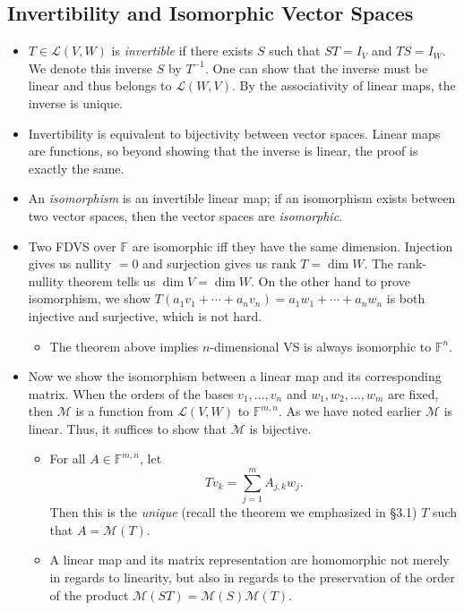 \documentclass{article}
\newcommand{\F}{\mathbb{F}}
\renewcommand{\d}{\dim}
\newcommand{\LVW}{\mathcal{L}(V,W)}
\newcommand{\M}{\mathcal{M}}
\newcommand{\bv}{v_1,\dots,v_n}
\begin{document}
\subsection{Invertibility and Isomorphic Vector Spaces}
\begin{itemize}
    \item $T \in \LVW$ is \textit{invertible} if there exists $S$ such that $ST = I_V$ and $TS = I_W$. We denote this inverse $S$ by $T^{-1}$. One can show that the inverse must be linear and thus belongs to $\mathcal{L}(W,V)$. By the associativity of linear maps, the inverse is unique.
    \item Invertibility is equivalent to bijectivity between vector spaces. Linear maps are functions, so beyond showing that the inverse is linear, the proof is exactly the same.
    \item An \textit{isomorphism} is an invertible linear map; if an isomorphism exists between two vector spaces, then the vector spaces are \textit{isomorphic}.
    \item Two FDVS over $\F$ are isomorphic iff they have the same dimension. Injection gives us $\text{nullity } = 0$ and surjection gives us $\text{rank } T = \d W$. The rank-nullity theorem tells us $\d V = \d W$. On the other hand to prove isomorphism, we show $T(a_1v_1+\cdots+a_nv_n) = a_1w_1+\cdots+a_nw_n$ is both injective and surjective, which is not hard.
    \begin{itemize}
        \item The theorem above implies $n$-dimensional VS is always isomorphic to $\F^n$.
    \end{itemize}
    \item Now we show the isomorphism between a linear map and its corresponding matrix. When the orders of the bases $\bv$ and $w_1,w_2,\dots,w_m$ are fixed, then $\M$ is a function from $\LVW$ to $\F^{m,n}$. As we have noted earlier $\M$ is linear. Thus, it suffices to show that $\M$ is bijective.
    \begin{itemize}
        \item For all $A \in \F^{m,n}$, let $$Tv_k = \sum_{j = 1}^m A_{j,k}w_j.$$ Then this is the \textit{unique} (recall the theorem we emphasized in \S3.1) $T$ such that $A = \M(T)$.
        \item A linear map and its matrix representation are homomorphic not merely in regards to linearity, but also in regards to the preservation of the order of the product $\M(ST) = \M(S)\M(T)$.
    \end{itemize}

\end{itemize}
\end{document}
